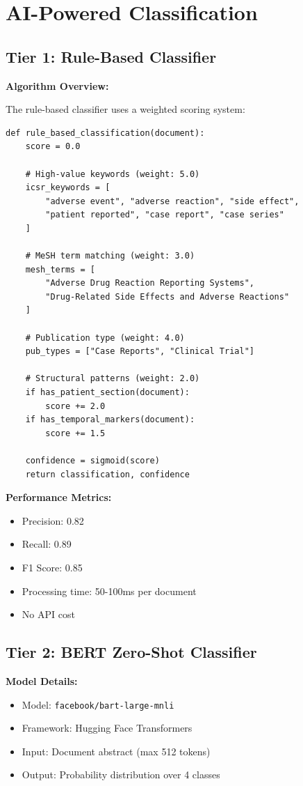 \section{AI-Powered Classification}

\subsection{Tier 1: Rule-Based Classifier}

\textbf{Algorithm Overview:}

The rule-based classifier uses a weighted scoring system:

\begin{lstlisting}[style=pythonstyle]
def rule_based_classification(document):
    score = 0.0
    
    # High-value keywords (weight: 5.0)
    icsr_keywords = [
        "adverse event", "adverse reaction", "side effect",
        "patient reported", "case report", "case series"
    ]
    
    # MeSH term matching (weight: 3.0)
    mesh_terms = [
        "Adverse Drug Reaction Reporting Systems",
        "Drug-Related Side Effects and Adverse Reactions"
    ]
    
    # Publication type (weight: 4.0)
    pub_types = ["Case Reports", "Clinical Trial"]
    
    # Structural patterns (weight: 2.0)
    if has_patient_section(document):
        score += 2.0
    if has_temporal_markers(document):
        score += 1.5
    
    confidence = sigmoid(score)
    return classification, confidence
\end{lstlisting}

\textbf{Performance Metrics:}
\begin{itemize}
    \item Precision: 0.82
    \item Recall: 0.89
    \item F1 Score: 0.85
    \item Processing time: 50-100ms per document
    \item No API cost
\end{itemize}

\subsection{Tier 2: BERT Zero-Shot Classifier}

\textbf{Model Details:}
\begin{itemize}
    \item Model: \texttt{facebook/bart-large-mnli}
    \item Framework: Hugging Face Transformers
    \item Input: Document abstract (max 512 tokens)
    \item Output: Probability distribution over 4 classes
\end{itemize}


